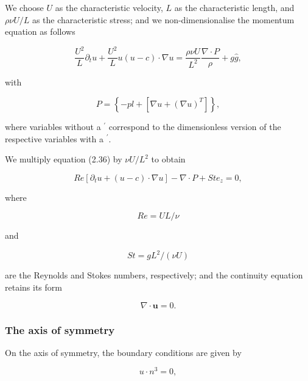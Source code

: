 \documentclass{article}
\begin{document}
We choose \(U\) as the characteristic velocity, \(L\) as the characteristic length, and \(\rho \nu U / L\) as the characteristic stress; and we non-dimensionalise the momentum equation as follows

\begin{equation}
\frac{U^2}{L}\partial_tu + \frac{U^2}{L} u(u - c)\cdot \nabla u = \frac{\rho\nu U}{L^2}\frac{\nabla\cdot P}{\rho} +g\hat{g}, \tag{2.36}
\end{equation}

with

\begin{equation}
P = \left\{-pl + \left[\nabla u + (\nabla u)^T\right]\right\}, \tag{2.37}
\end{equation}

where variables without a \(^{\prime}\) correspond to the dimensionless version of the respective variables with a \(^{\prime}\).

We multiply equation (2.36) by \(\nu U / L^2\) to obtain

\begin{equation}
R e[\partial_{t}u + (u - c)\cdot \nabla u] - \nabla \cdot P + S t e_{z} = 0, \tag{2.38}
\end{equation}

where

\begin{equation}
R e = U L / \nu \tag{2.39}
\end{equation}

and

\begin{equation}
S t = g L^{2} / (\nu U) \tag{2.40}
\end{equation}

are the Reynolds and Stokes numbers, respectively; and the continuity equation retains its form

\begin{equation}
\nabla \cdot \pmb {u} = 0. \tag{2.41}
\end{equation}

\subsubsection{The axis of symmetry}

On the axis of symmetry, the boundary conditions are given by

\begin{equation}
u\cdot n^3 = 0, \tag{2.42}
\end{equation}
\end{document}
